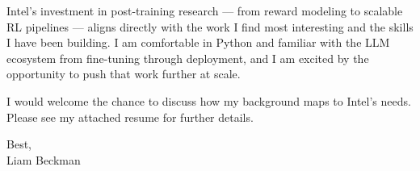 \vspace*{\baselineskip}

Intel's investment in post-training research --- from reward modeling to scalable RL pipelines --- aligns directly with the work I find most interesting and the skills I have been building. I am comfortable in Python and familiar with the LLM ecosystem from fine-tuning through deployment, and I am excited by the opportunity to push that work further at scale.

\vspace*{\baselineskip}

I would welcome the chance to discuss how my background maps to Intel's needs. Please see my attached resume for further details.

\vspace*{\baselineskip}

Best,\\

Liam Beckman

\vfill \myBreak{}



